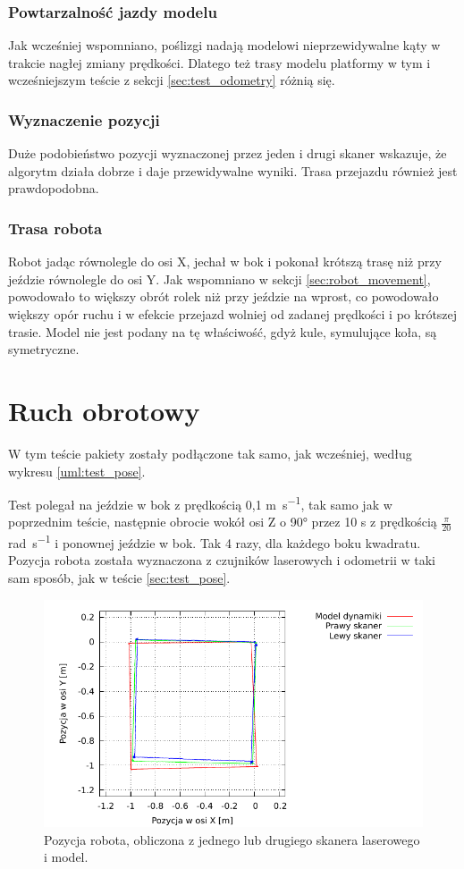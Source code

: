 	\subsubsection{Powtarzalność jazdy modelu}
		Jak wcześniej wspomniano, poślizgi nadają modelowi nieprzewidywalne kąty w trakcie nagłej zmiany prędkości. 
		Dlatego też trasy modelu platformy w tym i wcześniejszym teście z sekcji \ref{sec:test_odometry} różnią się. 
	\subsubsection{Wyznaczenie pozycji}
		Duże podobieństwo pozycji wyznaczonej przez jeden i drugi skaner wskazuje, że algorytm działa dobrze i daje przewidywalne wyniki.
		Trasa przejazdu również jest prawdopodobna.
	\subsubsection{Trasa robota}
		Robot jadąc równolegle do osi X, jechał w bok i pokonał krótszą trasę niż przy jeździe równolegle do osi Y. Jak wspomniano w sekcji \ref{sec:robot_movement}, powodowało to większy obrót rolek
		niż przy jeździe na wprost, co powodowało większy opór ruchu i w efekcie przejazd wolniej od zadanej prędkości i po krótszej trasie.
		Model nie jest podany na tę właściwość, gdyż kule, symulujące koła, są symetryczne.
	
\section{Ruch obrotowy}
	\label{sec:test_rotation}
	W tym teście pakiety zostały podłączone tak samo, jak wcześniej, według wykresu \ref{uml:test_pose}.
	
	Test polegał na jeździe w bok z prędkością 0,1 \si{\metre\per\second}, tak samo jak w poprzednim teście, następnie obrocie wokół osi Z o 90° przez 10 \si{\second} z prędkością $\frac{\pi}{20}$ \si{\radian\per\second} i ponownej jeździe w bok. Tak 4 razy, dla każdego boku kwadratu.
	Pozycja robota została wyznaczona z czujników laserowych i odometrii w taki sam sposób, jak w teście \ref{sec:test_pose}.
	
	\begin{figure}[H]
		\centering
		\includegraphics[width=\textwidth]{plots/rotation_matcher.pdf}
		\caption{Pozycja robota, obliczona z jednego lub drugiego skanera laserowego i model.}
		\label{plot:rotation}
	\end{figure}
	
